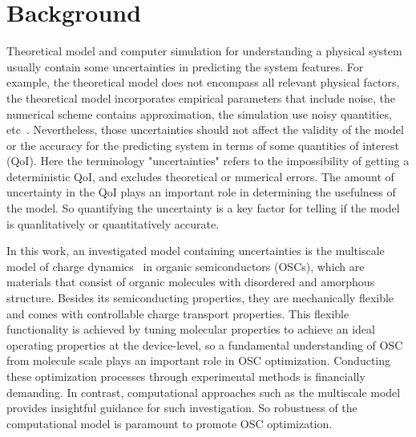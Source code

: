 \documentclass[%
 reprint,
 amsmath,amssymb,
 aps,
]{revtex4-2}
\begin{document}
\maketitle


\section{Background}

Theoretical model and computer simulation for understanding a physical system usually contain some uncertainties in predicting the system features. 
For example, the theoretical model does not encompass all relevant physical factors, the theoretical model incorporates empirical parameters that include noise, the numerical scheme contains approximation, the simulation use noisy quantities, etc~\cite{sarkar_uncertainty_2017,oconnor_quantifying_2024, chernatynskiy_uncertainty_2013, suleimenova_tutorial_2021,coveney_reliability_2021, coveney_when_2021}.
Nevertheless, those uncertainties should not affect the validity of the model or the accuracy for the predicting system in terms of some quantities of interest (QoI). 
Here the terminology "uncertainties" refers to the impossibility of getting a deterministic QoI, and excludes theoretical or numerical errors. 
The amount of uncertainty in the QoI plays an important role in determining the usefulness of the model. 
So quantifying the uncertainty is a key factor for telling if the model is quanlitatively or quantitatively accurate. 

In this work, an investigated model containing uncertainties is the multiscale model of charge dynamics~\cite{Baumeier2011, edeling_global_2024,coropceanu_charge_2007} in organic semiconductors (OSCs), which are materials that consist of organic molecules with disordered and amorphous structure. Besides its semiconducting properties, they are mechanically flexible and comes with controllable charge transport properties. 
This flexible functionality is achieved by tuning molecular properties to achieve an ideal operating properties at the device-level, so a fundamental understanding of OSC from molecule scale  plays an important role in OSC optimization.
Conducting these optimization processes through experimental methods is financially demanding. In contrast, computational approaches such as the multiscale model provides insightful guidance for such investigation. So robustness of the computational model is paramount to promote OSC optimization.
\end{document}
